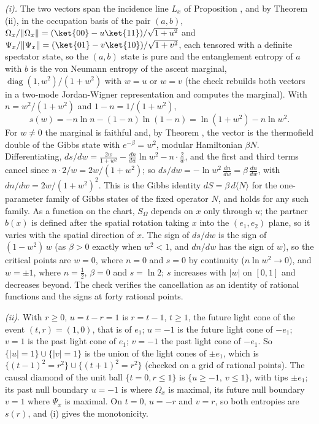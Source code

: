 \emph{(i).} The two vectors span the incidence line $L_{x}$ of Proposition , and by Theorem (ii), in the occupation basis of the pair $(a, b)$, $\Omega_{x}/\|\Omega_{x}\| = (\ket{00} - u\ket{11})/\sqrt{1 + u^{2}}$ and $\Psi_{x}/\|\Psi_{x}\| = (\ket{01} - v\ket{10})/\sqrt{1 + v^{2}}$, each tensored with a definite spectator state, so the $(a, b)$ state is pure and the entanglement entropy of $a$ with $b$ is the von Neumann entropy of the ascent marginal, $\operatorname{diag}(1, w^{2})/(1 + w^{2})$ with $w = u$ or $w = v$ (the check rebuilds both vectors in a two-mode Jordan-Wigner representation and computes the marginal). With $n = w^{2}/(1 + w^{2})$ and $1 - n = 1/(1 + w^{2})$,
\[
s(w) = -n\ln n - (1 - n)\ln(1 - n) = \ln(1 + w^{2}) - n\ln w^{2} .
\]
For $w \neq 0$ the marginal is faithful and, by Theorem , the vector is the thermofield double of the Gibbs state with $e^{-\beta} = w^{2}$, modular Hamiltonian $\beta N$. Differentiating, $ds/dw = \frac{2w}{1 + w^{2}} - \frac{dn}{dw}\ln w^{2} - n\cdot\frac{2}{w}$, and the first and third terms cancel since $n\cdot 2/w = 2w/(1 + w^{2})$; so $ds/dw = -\ln w^{2}\,\frac{dn}{dw} = \beta\,\frac{dn}{dw}$, with $dn/dw = 2w/(1 + w^{2})^{2}$. This is the Gibbs identity $dS = \beta\,d\langle N\rangle$ for the one-parameter family of Gibbs states of the fixed operator $N$, and holds for any such family. As a function on the chart, $S_{\Omega}$ depends on $x$ only through $u$; the partner $b(x)$ is defined after the spatial rotation taking $x$ into the $(e_{1}, e_{2})$ plane, so it varies with the spatial direction of $x$. The sign of $ds/dw$ is the sign of $(1 - w^{2})\,w$ (as $\beta > 0$ exactly when $w^{2} < 1$, and $dn/dw$ has the sign of $w$), so the critical points are $w = 0$, where $n = 0$ and $s = 0$ by continuity ($n\ln w^{2} \to 0$), and $w = \pm 1$, where $n = \tfrac12$, $\beta = 0$ and $s = \ln 2$; $s$ increases with $|w|$ on $[0, 1]$ and decreases beyond. The check verifies the cancellation as an identity of rational functions and the signs at forty rational points.

\emph{(ii).} With $r \geq 0$, $u = t - r = 1$ is $r = t - 1$, $t \geq 1$, the future light cone of the event $(t, r) = (1, 0)$, that is of $e_{1}$; $u = -1$ is the future light cone of $-e_{1}$; $v = 1$ is the past light cone of $e_{1}$; $v = -1$ the past light cone of $-e_{1}$. So $\{|u| = 1\}\cup\{|v| = 1\}$ is the union of the light cones of $\pm e_{1}$, which is $\{(t - 1)^{2} = r^{2}\}\cup\{(t + 1)^{2} = r^{2}\}$ (checked on a grid of rational points). The causal diamond of the unit ball $\{t = 0, r \leq 1\}$ is $\{u \geq -1,\ v \leq 1\}$, with tips $\pm e_{1}$; its past null boundary $u = -1$ is where $\Omega_{x}$ is maximal, its future null boundary $v = 1$ where $\Psi_{x}$ is maximal. On $t = 0$, $u = -r$ and $v = r$, so both entropies are $s(r)$, and (i) gives the monotonicity.

